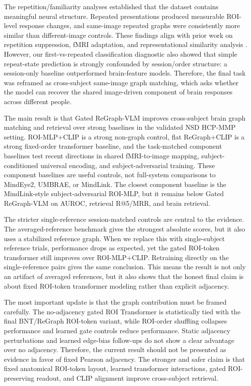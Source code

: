 \documentclass{article}
\begin{document}
The repetition/familiarity analyses established that the dataset contains meaningful neural structure. Repeated presentations produced measurable ROI-level response changes, and same-image repeated graphs were consistently more similar than different-image controls. These findings align with prior work on repetition suppression, fMRI adaptation, and representational similarity analysis \citep{grill2001fmri,henson2003repetition,grill2006repetition,krekelberg2006adaptation,kriegeskorte2008rsa}. However, our first-vs-repeated classification diagnostic also showed that simple repeat-state prediction is strongly confounded by session/order structure: a session-only baseline outperformed brain-feature models. Therefore, the final task was reframed as cross-subject same-image graph matching, which asks whether the model can recover the shared image-driven component of brain responses across different people.

The main result is that Gated ReGraph-VLM improves cross-subject brain graph matching and retrieval over strong baselines in the validated NSD HCP-MMP setting. ROI-MLP+CLIP is a strong non-graph control, flat ReGraph+CLIP is a strong fixed-order transformer baseline, and the task-matched component baselines test recent directions in shared fMRI-to-image mapping, subject-conditioned universal encoding, and subject-adversarial training. These component baselines are useful controls, not full-system comparisons to MindEye2, UMBRAE, or MindLink. The closest component baseline is the MindLink-style subject-adversarial ROI-MLP, but it remains below Gated ReGraph-VLM on AUROC, retrieval R@5/MRR, and brain retrieval.

The stricter single-reference session-matched controls are central to the evidence. The averaged-reference benchmark gives the strongest absolute scores, but it also uses a stabilized reference graph. When we replace this with single-subject reference trials, performance drops as expected, yet the gated ROI-token transformer still improves over ROI-MLP+CLIP. Retraining directly on the single-reference pairs gives the same conclusion. This means the result is not only an artifact of averaged references, but it also shows that the honest final claim is about fixed ROI-token transformer modeling rather than explicit adjacency.

The most important update is that the graph contribution must be framed carefully. The no-adjacency gated ROI Transformer is statistically tied with the final BNT/ReGraph ROI-token variant, while ROI-order shuffling collapses performance and learned gate controls reduce performance. Static adjacency perturbations and learned edge-bias follow-ups do not show a clear advantage over no adjacency. Therefore, the current result should not be presented as evidence in favor of fixed Pearson adjacency. The stronger and safer claim is that fixed anatomical ROI-token layout, learned transformer interactions, gated ROI-preserving readout, and CLIP alignment improve cross-subject retrieval.
\end{document}
